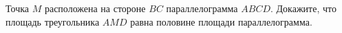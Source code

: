 \begin{ex}
	\begin{condition}
		Точка \( M  \) расположена на стороне \( BC  \) параллелограмма \( ABCD \). Докажите, что площадь треугольника \( AMD \) равна половине площади параллелограмма.
	\end{condition}
\end{ex}